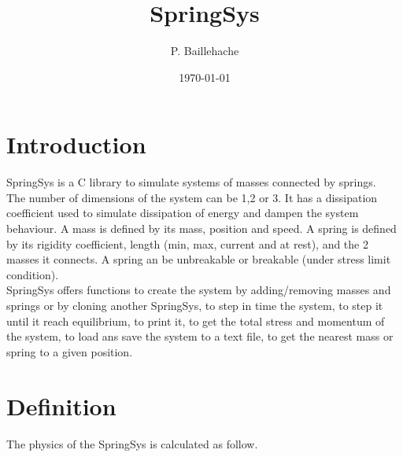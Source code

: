 \documentclass[12pt, a4paper]{article}
\begin{document}
\title{SpringSys}
\author{P. Baillehache}
\date{\today}
\maketitle

\tableofcontents

\section*{Introduction}

SpringSys is a C library to simulate systems of masses connected by springs.\\

The number of dimensions of the system can be 1,2 or 3. It has a dissipation coefficient used to simulate dissipation of energy and dampen the system behaviour. A mass is defined by its mass, position and speed. A spring is defined by its rigidity coefficient, length (min, max, current and at rest), and the 2 masses it connects. A spring an be unbreakable or breakable (under stress limit condition).\\

SpringSys offers functions to create the system by adding/removing masses and springs or by cloning another SpringSys, to step in time the system, to step it until it reach equilibrium, to print it, to get the total stress and momentum of the system, to load ans save the system to a text file, to get the nearest mass or spring to a given position.\\ 

\section{Definition}

The physics of the SpringSys is calculated as follow.\\
\end{document}
